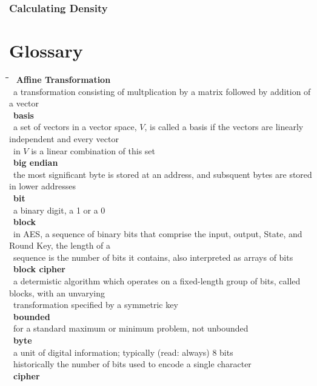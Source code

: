 \documentclass[10pt,letterpaper]{scrartcl}
\newcommand{\tbul}{\textbullet}
\newcommand{\tend}{\>\textendash}
\newcommand{\tabDef}{\hspace{2em}\=\hspace{2em}\=\hspace{2em}\=\hspace{2em}\=\kill}
\begin{document}
\subsubsection*{Calculating Density}


\newpage\section{Glossary}\begin{tabbing}\tabDef 
\tbul\ \textbf{Affine Transformation} \\
    \tend\ a transformation consisting of multplication by a matrix followed by addition of a vector \\
\tbul\ \textbf{basis} \\
    \tend\ a set of vectors in a vector space, $V$, is called a basis if the vectors are linearly independent and every vector \\ \>\ in $V$ is a linear combination of this set \\
\tbul\ \textbf{big endian} \\
    \tend\ the most significant byte is stored at an address, and subsquent bytes are stored in lower addresses\\
\tbul\ \textbf{bit} \\
    \tend\ a binary digit, a 1 or a 0 \\
\tbul\ \textbf{block} \\
    \tend\ in AES, a sequence of binary bits that comprise the input, output, State, and Round Key, the length of a \\ \>\ sequence is the number of bits it contains, also interpreted as arrays of bits \\
\tbul\ \textbf{block cipher} \\
    \tend\ a determistic algorithm which operates on a fixed-length group of bits, called blocks, with an unvarying \\ \>\ transformation specified by a symmetric key \\
\tbul\ \textbf{bounded} \\
    \tend\ for a standard maximum or minimum problem, not unbounded \\
\tbul\ \textbf{byte} \\
    \tend\ a unit of digital information; typically (read: always) 8 bits \\
    \tend\ historically the number of bits used to encode a single character \\
\tbul\ \textbf{cipher} \\

\end{tabbing}
\end{document}
